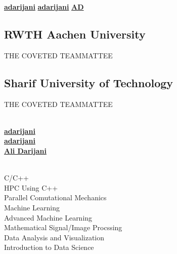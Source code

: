 \documentclass[a4paper]{MagicalCV}
\begin{document}
\lastupdated

  \href{https://github.com/adarijani}{\bf adarijani} 
 \href{https://github.com/adarijani}{\bf adarijani}
 \href{https://www.linkedin.com/in/ali-darijani-675b52241/}{\bf AD}


\begin{minipage}[t]{0.33\textwidth} 


\subsection{RWTH Aachen University}
\vspace{\topsep} %
\begin{tightemize}
\item THE COVETED TEAMMATTEE
\end{tightemize}
\sectionsep

\subsection{Sharif University of Technology}
\begin{tightemize}
\item THE COVETED TEAMMATTEE
\end{tightemize}
\sectionsep

\\
 \href{https://github.com/adarijani}{\bf adarijani} \\
 \href{https://github.com/adarijani}{\bf adarijani} \\
 \href{https://www.linkedin.com/in/ali-darijani-675b52241/}{\bf Ali Darijani}
\sectionsep

\\
C\slash C++\\
HPC Using C++\\
Parallel Comutational Mechanics\\
Machine Learning\\
Advanced Machine Learning\\
Mathematical Signal/Image Procssing\\
Data Analysis and Visualization\\
Introduction to Data Science\\




\end{minipage}
\end{document}
